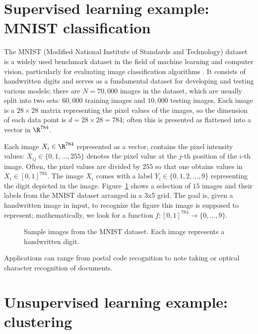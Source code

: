\section{Supervised learning example: MNIST classification}
\label{sec:ch1-mnist}

The MNIST (Modified National Institute of Standards and Technology) dataset
is a widely used benchmark dataset in the field of machine learning and computer
vision, particularly for evaluating image classification algorithms \cite{turinici6}.
It consists of handwritten digits and serves as a fundamental dataset for developing
and testing various models; there are $N = 70{,}000$ images in the dataset,
which are usually split into two sets: $60{,}000$ training images and $10{,}000$ testing
images. Each image is a $28 \times 28$ matrix representing the pixel values of the
images, so the dimension of each data point is $d = 28 \times 28 = 784$; often this is
presented as flattened into a vector in $\R^{784}$.

Each image $X_i \in \R^{784}$ represented as a vector, contains the pixel intensity
values: $X_{ij} \in \{0, 1, \ldots, 255\}$ denotes the pixel value at the $j$-th position of
the $i$-th image. Often, the pixel values are divided by $255$ so that one obtains
values in $X_i \in [0,1]^{784}$. The image $X_i$ comes with a label $Y_i \in \{0, 1, 2, \ldots, 9\}$
representing the digit depicted in the image. Figure~\ref{fig:ch1-mnist} shows a selection
of $15$ images and their labels from the MNIST dataset arranged in a 3x5
grid. The goal is, given a handwritten image in input, to recognize the figure
this image is supposed to represent; mathematically, we look for a function
$f : [0,1]^{784} \to \{0, \ldots, 9\}$.

\begin{figure}[h]\centering
\caption{Sample images from the MNIST dataset. Each image represents a handwritten digit.}
\label{fig:ch1-mnist}
\end{figure}

Applications can range from postal code recognition to note taking or optical
character recognition of documents.

\section{Unsupervised learning example: clustering}
\label{sec:ch1-clustering}

